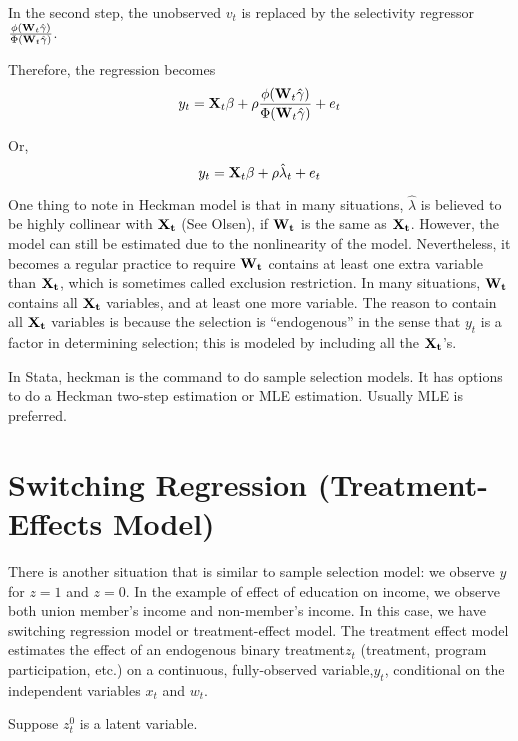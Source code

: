 In the second step, the unobserved $v_t$ is replaced by the
selectivity regressor $\frac{\phi({\bf W}_t \hat
\gamma)}{\Phi({\bf W}_t \hat \gamma)}$.

Therefore, the regression becomes
\begin{equation}
y_t={\bf X}_t \beta + \rho \frac{\phi({\bf W}_t \hat
\gamma)}{\Phi({\bf W}_t \hat \gamma)} + e_t
\end{equation}

Or,
\begin{equation}
y_t={\bf X}_t \beta + \rho \hat \lambda_t + e_t
\end{equation}

One thing to note in Heckman model is that in many situations, $\hat
\lambda$ is believed to be highly collinear with $\bf X_t$ (See
Olsen), if $\bf W_t$ is the same as $\bf X_t$.  However, the model can
still be estimated due to the nonlinearity of the model.
Nevertheless, it becomes a regular practice to require $\bf W_t$
contains at least one extra variable than $\bf X_t$, which is
sometimes called exclusion restriction.  In many situations, $\bf W_t$
contains all $\bf X_t$ variables, and at least one more variable.  The
reason to contain all $\bf X_t$ variables is because the selection is
``endogenous'' in the sense that $y_t$ is a factor in determining
selection; this is modeled by including all the $\bf X_t$'s.


In Stata, heckman is the command to do sample selection models.  It
has options to do a Heckman two-step estimation or MLE estimation.
Usually MLE is preferred.

\section{Switching Regression (Treatment-Effects Model)}


There is another situation that is similar to sample selection model:
we observe $y$ for $z=1$ and $z=0$.  In the example of effect of
education on income, we observe both union member's income and
non-member's income.  In this case, we have switching regression model
or treatment-effect model.  The treatment effect model estimates the
effect of an endogenous binary treatment$z_t$ (treatment, program
participation, etc.) on a continuous, fully-observed variable,$y_t$,
conditional on the independent variables $x_t$ and $w_t$.

Suppose $z_t^0$ is a latent variable.

